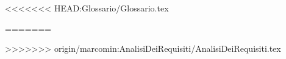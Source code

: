 \newcommand{\lastversion}{0.1.0}%
\newcommand{\doctitle}{Glossario}%
\newcommand{\info}{\doctitle\ v\lastversion}


<<<<<<< HEAD:Glossario/Glossario.tex


\newpage

=======



%
>>>>>>> origin/marcomin:AnalisiDeiRequisiti/AnalisiDeiRequisiti.tex

